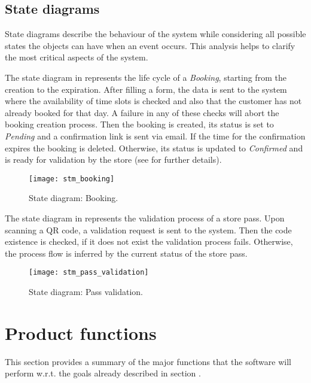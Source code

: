 \clearpage

\subsection{State diagrams}
State diagrams describe the behaviour of the system while considering all possible states the objects can have when an event occurs. This analysis helps to clarify the most critical aspects of the system.

The state diagram in  represents the life cycle of a \textit{Booking}, starting from the creation to the expiration.\newline
After filling a form, the data is sent to the system where the availability of time slots is checked and also that the customer has not already booked for that day. A failure in any of these checks will abort the booking creation process.\newline
Then the booking is created, its status is set to \textit{Pending} and a confirmation link is sent via email. If the time for the confirmation expires the booking is deleted.\newline
Otherwise, its status is updated to \textit{Confirmed} and is ready for validation by the store (see  for further details).

\begin{figure}[H]
	\centering
	\texttt{[image: stm\_booking]}
	\caption{State diagram: Booking.}
	\label{fig:stm_booking}
\end{figure}

The state diagram in  represents the validation process of a store pass.\newline
Upon scanning a QR code, a validation request is sent to the system. Then the code existence is checked, if it does not exist the validation process fails. Otherwise, the process flow is inferred by the current status of the store pass.

\begin{figure}[H]
	\centering
	\texttt{[image: stm\_pass\_validation]}
	\caption{State diagram: Pass validation.}
	\label{fig:stm_pass_validation}
\end{figure}

\clearpage

\section{Product functions}\label{desc:prodFunc}
This section provides a summary of the major functions that the software will perform w.r.t. the goals already described in section .

